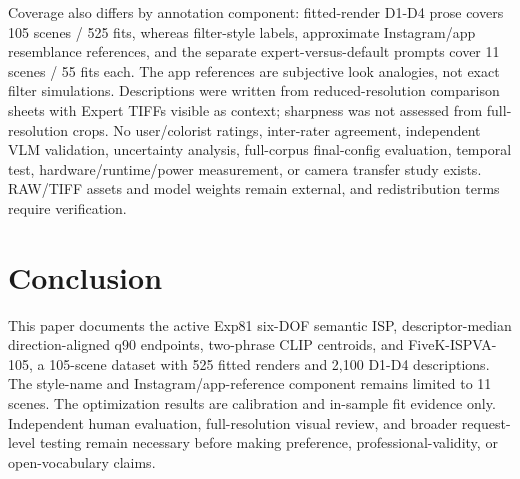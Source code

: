 \documentclass[journal]{IEEEtran}
\begin{document}
Coverage also differs by annotation component: fitted-render D1-D4 prose covers 105 scenes / 525 fits, whereas filter-style labels, approximate Instagram/app resemblance references, and the separate expert-versus-default prompts cover 11 scenes / 55 fits each. The app references are subjective look analogies, not exact filter simulations. Descriptions were written from reduced-resolution comparison sheets with Expert TIFFs visible as context; sharpness was not assessed from full-resolution crops. No user/colorist ratings, inter-rater agreement, independent VLM validation, uncertainty analysis, full-corpus final-config evaluation, temporal test, hardware/runtime/power measurement, or camera transfer study exists. RAW/TIFF assets and model weights remain external, and redistribution terms require verification.

\section{Conclusion}
This paper documents the active Exp81 six-DOF semantic ISP, descriptor-median direction-aligned q90 endpoints, two-phrase CLIP centroids, and FiveK-ISPVA-105, a 105-scene dataset with 525 fitted renders and 2,100 D1-D4 descriptions. The style-name and Instagram/app-reference component remains limited to 11 scenes. The optimization results are calibration and in-sample fit evidence only. Independent human evaluation, full-resolution visual review, and broader request-level testing remain necessary before making preference, professional-validity, or open-vocabulary claims.

\appendices
\end{document}
